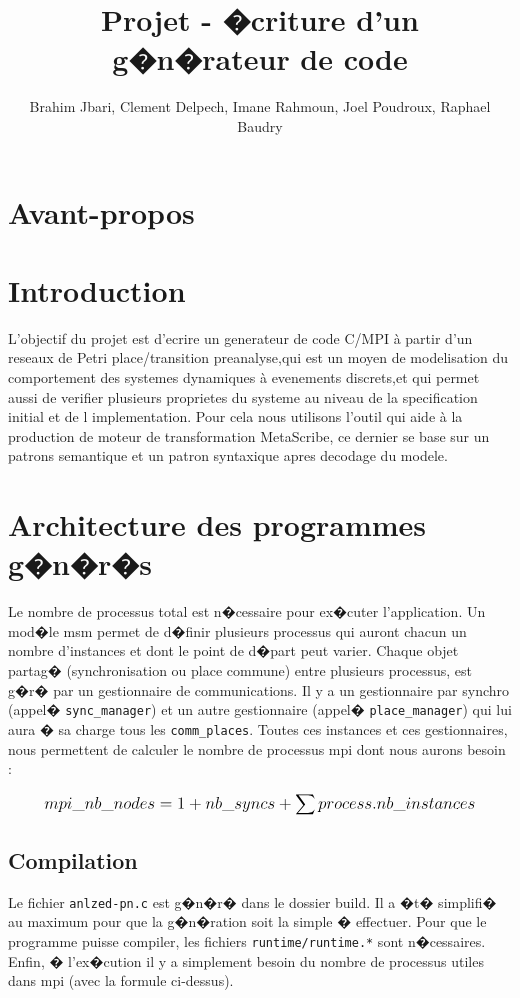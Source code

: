\documentclass[10pt,a4paper]{article}
\title{\HeaderSar
Projet - �criture d'un g�n�rateur de code
}
\author{
Brahim Jbari,
Clement Delpech,
Imane Rahmoun,
Joel Poudroux,
Raphael Baudry}
\begin{document}
\maketitle
\vskip 2cm
\tableofcontents
\vfill
\eject

\section*{Avant-propos}


\section{Introduction}
L'objectif du projet est d'ecrire un generateur de code C/MPI à partir d'un 
reseaux de Petri place/transition preanalyse,qui est  un moyen 
de modelisation du comportement des systemes dynamiques à evenements discrets,et 
qui permet aussi de verifier plusieurs proprietes du systeme au niveau de la specification initial et de l implementation.
Pour cela nous utilisons l'outil qui aide à la production de moteur de transformation MetaScribe,
ce dernier se base sur un  patrons semantique et un patron syntaxique apres decodage du modele.
\section{Architecture des programmes g�n�r�s}

Le nombre de processus total est n�cessaire pour ex�cuter l'application.
Un mod�le msm permet de d�finir plusieurs processus qui auront chacun un
nombre d'instances et dont le point de d�part peut varier. Chaque objet
partag� (synchronisation ou place commune) entre plusieurs processus, est
g�r� par un gestionnaire de communications. Il y a un gestionnaire par
synchro (appel� {\tt sync\_manager}) et un autre gestionnaire (appel�
{\tt place\_manager}) qui lui aura � sa charge tous les {\tt comm\_places}.
Toutes ces instances et ces gestionnaires, nous permettent de calculer le
nombre de processus mpi dont nous aurons besoin :

\begin{align*}
\mbox{\large$\displaystyle mpi\_nb\_nodes = 1 + nb\_syncs +
  \sum{process.nb\_instances}$}
\end{align*}


\subsection{Compilation}

Le fichier {\tt anlzed-pn.c} est g�n�r� dans le dossier build. Il a �t� simplifi� au
maximum pour que la g�n�ration soit la simple � effectuer. Pour que le programme
puisse compiler, les fichiers {\tt runtime/runtime.*} sont n�cessaires. Enfin, �
l'ex�cution il y a simplement besoin du nombre de processus utiles dans mpi (avec
la formule ci-dessus).
\end{document}
